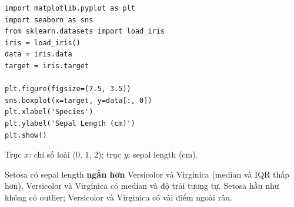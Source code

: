 \begin{vidu}[title={Boxplot sepal length theo species}]
\begin{lstlisting}
import matplotlib.pyplot as plt
import seaborn as sns
from sklearn.datasets import load_iris
iris = load_iris()
data = iris.data
target = iris.target

plt.figure(figsize=(7.5, 3.5))
sns.boxplot(x=target, y=data[:, 0])
plt.xlabel('Species')
plt.ylabel('Sepal Length (cm)')
plt.show()
\end{lstlisting}

Trục $x$: chỉ số loài (0, 1, 2); trục $y$: sepal length (cm).
\end{vidu}

\begin{ynghia}[title={Đọc biểu đồ}]
Setosa có sepal length \textbf{ngắn hơn} Versicolor và Virginica (median và IQR thấp hơn).
Versicolor và Virginica có median và độ trải tương tự.
Setosa hầu như không có outlier; Versicolor và Virginica có vài điểm ngoài râu.
\end{ynghia}

\begin{vidu}[title={Output}]
\end{vidu}
